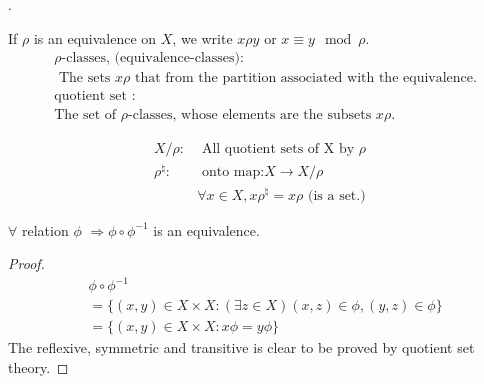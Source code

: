 \begin{Def}.

    If $\rho$ is an equivalence on $X$, we write $x \rho y $ or $x\equiv y \mod{\rho }$.
    \begin{align*}
        &\rho\text{-classes, (equivalence-classes):}\\
        &\text{  The sets } x\rho \text{ that from the partition associated with the equivalence.} \\
        &\text{quotient set :}  \\
        &\text{The set of }\rho\text{-classes, whose elements are the subsets }x\rho.
    \end{align*}
\end{Def}

\begin{Sym}
    \begin{align*}
        X/\rho :&\text{ All quotient sets of X by }\rho  \\
        \rho^{\natural} :&\text{ onto map:} X\rightarrow X/\rho \\
        &\forall x\in X, x\rho^{\natural} = x\rho \text{ (is a set.)}
    \end{align*}
\end{Sym}

\begin{Prop}$\forall$ relation $\phi$ $\Rightarrow \phi \circ \phi^{-1} $ is an equivalence.

\begin{proof}
    \begin{align*}
        &\phi \circ \phi^{-1} \\
        &=\{(x,y)\in X\times X: (\exists z\in X)(x,z)\in \phi ,(y,z)\in \phi\}   \\
        &=\{(x,y)\in X\times X: x\phi =y\phi \}
    \end{align*}
    The reflexive, symmetric and transitive is clear to be proved by quotient set theory.
\end{proof}
\end{Prop}

